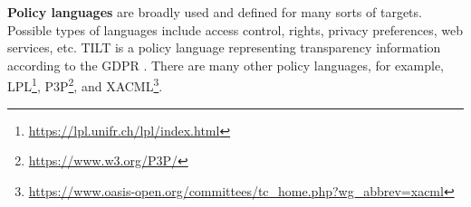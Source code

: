 \textbf{Policy languages} are broadly used and defined for many sorts of targets. Possible types of languages include access control, rights, privacy preferences, web services, etc. TILT is a policy language representing transparency information according to the GDPR \cite{noauthor_review_nodate}.
There are many other policy languages, for example, LPL\footnote{\url{https://lpl.unifr.ch/lpl/index.html}}, P3P\footnote{\url{https://www.w3.org/P3P/}}, and XACML\footnote{\url{https://www.oasis-open.org/committees/tc_home.php?wg_abbrev=xacml}}. 